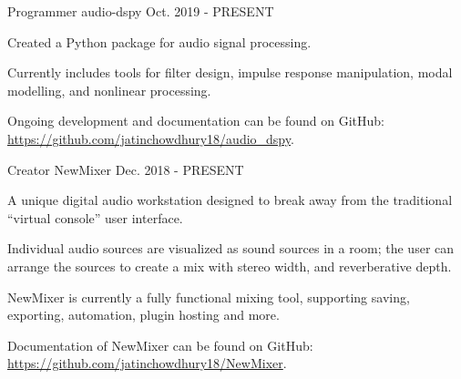 

\begin{cventries}

    \cventry
    {Programmer} %
    {audio-dspy} %
    {} %
    {Oct. 2019 - PRESENT} %
    {
      \begin{cvitems} %
        \item {Created a Python package for audio signal processing.}
        \item {Currently includes tools for filter design, impulse response manipulation, modal modelling, and nonlinear processing.}
        \item {Ongoing development and documentation can be found on GitHub: \url{https://github.com/jatinchowdhury18/audio_dspy}.}
      \end{cvitems}
    }

  \cventry
    {Creator} %
    {NewMixer} %
    {} %
    {Dec. 2018 - PRESENT} %
    {
      \begin{cvitems} %
        \item {A unique digital audio workstation designed to break away from the traditional ``virtual console'' user interface.}
        \item {Individual audio sources are visualized as sound sources in a room; the user can arrange the sources to create a mix with stereo width, and reverberative depth.}
        \item {NewMixer is currently a fully functional mixing tool, supporting saving, exporting, automation, plugin hosting and more.}
        \item {Documentation of NewMixer can be found on GitHub: \url{https://github.com/jatinchowdhury18/NewMixer}.}
      \end{cvitems}
    }


\end{cventries}
